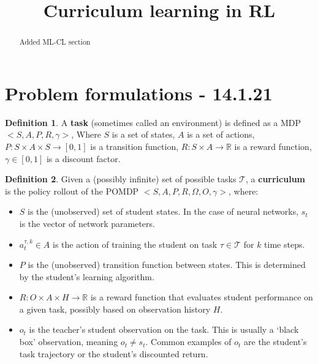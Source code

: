 \documentclass[letterpaper]{article}
\title{Curriculum learning in RL}
\theoremstyle{definition}
\newtheorem{defn}{Definition}[section]
\begin{document}
	\maketitle
	\begin{abstract}
		Added ML-CL section
	\end{abstract}

\tableofcontents

\section{Problem formulations - 14.1.21} \label{sec:formulation}
\begin{defn}
	A \textbf{task} (sometimes called an environment) is defined as a MDP $<S,A,P,R,\gamma>$,
	Where $S$ is a set of states, $A$ is a set of actions, $P:S\times A\times S\rightarrow [0,1]$ is a transition function, 
	$R:S\times A\rightarrow \mathbb{R}$ is a reward function, $\gamma\in[0,1]$ is a discount factor.
\end{defn}

\begin{defn} \label{defn:curriculum-pomdp}
	Given a (possibly infinite) set of possible tasks $\mathcal{T}$, a \textbf{curriculum} is the policy rollout of the POMDP $<S,A,P,R,\Omega,O, \gamma>$, where:
	\begin{itemize}
		\item $S$ is the (unobserved) set of student states. In the case of neural networks, $s_t$ is the vector of network parameters.
		\item $a_{t}^{\tau, k}\in A$ is the action of training the student on task $\tau\in \mathcal{T}$ for $k$ time steps.
		\item $P$ is the (unobserved) transition function between states. This is determined by the student's learning algorithm.
		\item $R:O\times A\times H \rightarrow \mathbb{R}$ is a reward function that evaluates student performance on a given task, possibly based on observation history $H$.
		\item $o_t$ is the teacher's student observation on the task. This is usually a `black box' observation, meaning $o_t\neq s_t$. Common examples of $o_t$ are the student's task trajectory or the student's discounted return.
	\end{itemize}	
\end{defn}
\end{document}
